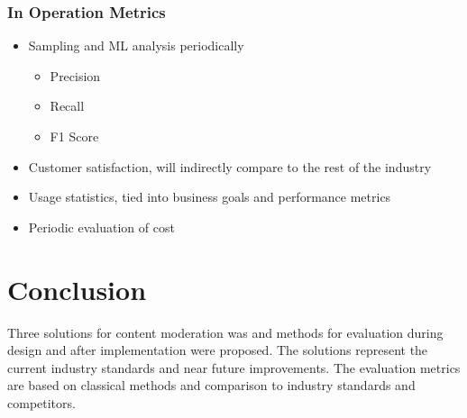 \documentclass[
	letterpaper, %
	12pt, %
	unnumberedsections, %
	twoside, %
]{LTJournalArticle}
\begin{document}
\subsubsection*{In Operation Metrics}
\begin{itemize}
	\item Sampling and ML analysis periodically
	      \begin{itemize}
		      \item Precision
		      \item Recall
		      \item F1 Score
	      \end{itemize}
	\item Customer satisfaction, will indirectly compare to the rest of the industry
	\item Usage statistics, tied into business goals and performance metrics
	\item Periodic evaluation of cost
\end{itemize}




\section{Conclusion}
Three solutions for content moderation was and methods for evaluation during design and after implementation were proposed. The solutions represent the current industry standards and near future improvements. The evaluation metrics are based on classical methods and comparison to industry standards and competitors.


\printbibliography %





%
%
%
\end{document}
